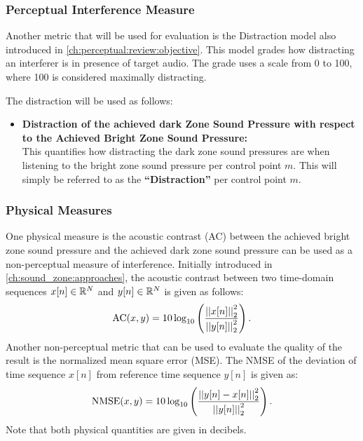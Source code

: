 \subsubsection{Perceptual Interference Measure}
Another metric that will be used for evaluation is the Distraction model also introduced in \autoref{ch:perceptual:review:objective}.
This model grades how distracting an interferer is in presence of target audio.
The grade uses a scale from 0 to 100, where 100 is considered maximally distracting.

The distraction will be used as follows:
\begin{itemize}
    \item \textbf{Distraction of the achieved dark Zone Sound Pressure with respect to the Achieved Bright 
        Zone Sound Pressure:}\\
        This quantifies how distracting the dark zone sound pressures are when listening to the bright zone 
        sound pressure per control point $m$. 
        This will simply be referred to as the \textbf{``Distraction''} per control point $m$.
\end{itemize}

\subsubsection{Physical Measures}
One physical measure is the acoustic contrast (AC) between the 
achieved bright zone sound pressure and the achieved dark zone sound pressure can be used as a non-perceptual measure of interference.
Initially introduced in \autoref{ch:sound_zone:approaches}, 
the acoustic contrast between two time-domain sequences $x[n]\in\mathbb{R}^{N}$
and $y[n]\in\mathbb{R}^{N}$ is given as follows: 
\begin{equation}
    \mathrm{AC}(x,y) = 10\log_{10}\left(\frac{\norm[2][2]{x[n]}}{\norm[2][2]{y[n]}}\right).
\end{equation}
Another non-perceptual metric that can be used to evaluate the quality of the result is the normalized mean square error (MSE).
The NMSE of the deviation of time sequence $x[n]$ from reference time sequence $y[n]$ is given as:
\begin{equation}
    \text{NMSE}(x,y) = 10\log_{10}\left(\frac{\norm[2][2]{y[n] - x[n]}}{\norm[2][2]{y[n]}}\right).
\end{equation}
Note that both physical quantities are given in decibels.

